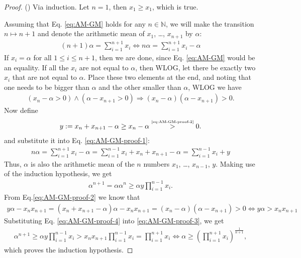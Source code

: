 \documentclass[12pt, a4paper]{article}
\numberwithin{equation}{section}
\theoremstyle{definition}
\theoremstyle{definition}
\begin{document}
	\begin{proof}(\cite{Wiki:AM-GM})
		Via induction. Let $n=1$, then $x_1 \geq x_1$, which is true. 
		
		Assuming that Eq. \eqref{eq:AM-GM} holds for any $n\in\mathbb N$, we will make the transition $n\mapsto n + 1$ and denote the arithmetic mean of $x_1$, \dots, $x_{n + 1}$ by $\alpha$:
		\begin{align}\label{eq:AM-GM-proof-1}
			(n + 1) \alpha = \sum_{i=1}^{n + 1} x_i \Leftrightarrow n\alpha = \sum_{i=1}^{n + 1}x_i - \alpha
		\end{align}
		If $x_i = \alpha$ for all $1\leq i\leq n + 1$, then we are done, since Eq. \eqref{eq:AM-GM} would be an equality. If all the $x_i$ are not equal to $\alpha$, then WLOG, let there be exactly two $x_i$ that are not equal to $\alpha$. Place these two elements at the end, and noting that one needs to be bigger than $\alpha$ and the other smaller than $\alpha$, WLOG we have 
		\begin{align}\label{eq:AM-GM-proof-2}
			\left(x_n - \alpha > 0\right) \wedge \left( \alpha - x_{n+1} > 0 \right) \Rightarrow (x_n - \alpha)(\alpha - x_{n+1}) > 0.
		\end{align}
		Now define
		\begin{align}
			y := x_{n} + x_{n + 1} - \alpha \geq x_{n} - \alpha \overset{\tiny\eqref{eq:AM-GM-proof-2}}{>} 0.
		\end{align}
		and substitute it into Eq. \eqref{eq:AM-GM-proof-1}:
		\begin{align}
			n\alpha = \sum_{i=1}^{n + 1}x_i - \alpha = \sum_{i=1}^{n-1}x_i + x_n + x_{n+1} - \alpha = \sum_{i=1}^{n-1}x_i + y
		\end{align}
		Thus, $\alpha$ is also the arithmetic mean of the $n$ numbers $x_1$, \dots, $x_{n-1}$, $y$. Making use of the induction hypothesis, we get
		\begin{align}\label{eq:AM-GM-proof-3}
			\alpha^{n+1} = \alpha\alpha^n \geq \alpha y\prod_{i=1}^{n-1} x_i.
		\end{align}
		From Eq.\eqref{eq:AM-GM-proof-2} we know that 
		\begin{align}\label{eq:AM-GM-proof-4}
			y\alpha - x_{n}x_{n+1} = (x_{n} + x_{n + 1} - \alpha)\alpha - x_{n}x_{n+1} = (x_n - \alpha)(\alpha - x_{n+1}) > 0 \Leftrightarrow y\alpha > x_{n}x_{n+1}
		\end{align}
		Substituting Eq. \eqref{eq:AM-GM-proof-4} into \eqref{eq:AM-GM-proof-3}, we get
		\begin{align}
			\alpha^{n+1} \geq \alpha y\prod_{i=1}^{n-1} x_i > x_nx_{n+1}\prod_{i=1}^{n-1} x_i = \prod_{i=1}^{n + 1} x_i \Leftrightarrow \alpha \geq \left(\prod_{i=1}^{n+1}x_i\right)^{\frac{1}{n+1}},
		\end{align}
		which proves the induction hypothesis.
	\end{proof}
	
\end{document}
